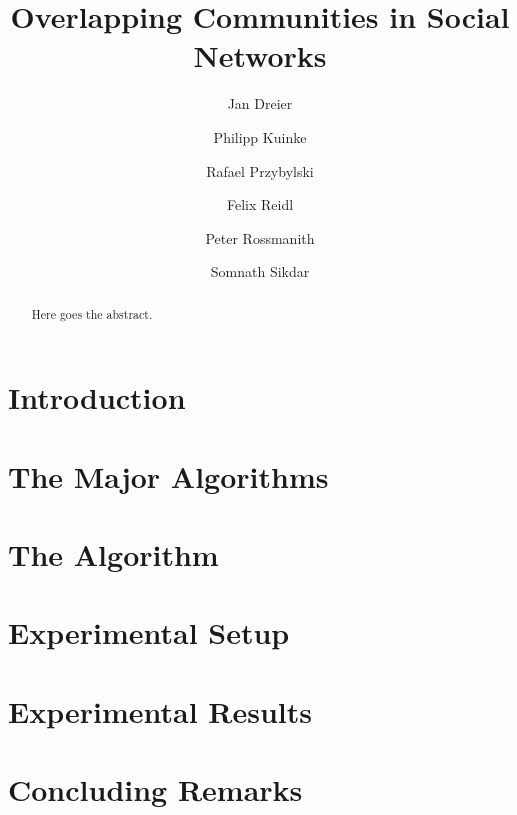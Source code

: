 \documentclass[12pt]{article}
\title{Overlapping Communities in Social Networks}
\author{Jan Dreier 
\and Philipp Kuinke 
\and Rafael Przybylski 
\and Felix Reidl 
\and Peter Rossmanith 
\and Somnath Sikdar}
\date{}
\begin{document}
\maketitle

\begin{abstract}
Here goes the abstract.
\end{abstract}

\section{Introduction}


\section{The Major Algorithms} \label{sec:major_algorithms}


\section{The Algorithm} \label{sec:algorithm}


\section{Experimental Setup} \label{sec:experiment_setup}



\section{Experimental Results}\label{sec:experiment_results}





%

\section{Concluding Remarks} \label{sec:conclusions}

\def\redefineme{
    \def\LNCS{LNCS}%
    \def\ICALP##1{Proc. of ##1 ICALP}%
    \def\FOCS##1{Proc. of ##1 FOCS}%
    \def\COCOON##1{Proc. of ##1 COCOON}%
    \def\SODA##1{Proc. of ##1 SODA}%
    \def\SWAT##1{Proc. of ##1 SWAT}%
    \def\IWPEC##1{Proc. of ##1 IWPEC}%
    \def\IWOCA##1{Proc. of ##1 IWOCA}%
    \def\ISAAC##1{Proc. of ##1 ISAAC}%
    \def\STACS##1{Proc. of ##1 STACS}%
    \def\ESA##1{Proc. of ##1 ESA}%
    \def\WG##1{Proc. of ##1 WG}%
    \def\LIPIcs##1{LIPIcs}%
    \def\LIPIcs{LIPIcs}%
    \def\LICS##1{Proc. of ##1 LICS}%
}

%


\end{document}
